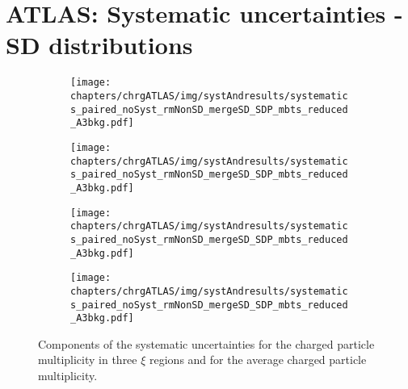 \chapter{{ATLAS: Systematic uncertainties - SD distributions}}\label{section:atlas_systematics_sd}

\begin{figure}[h!]
	\centering
	\begin{subfigure}{.49\textwidth}
		\texttt{[image: chapters/chrgATLAS/img/systAndresults/systematics\_paired\_noSyst\_rmNonSD\_mergeSD\_SDP\_mbts\_reduced\_A3bkg.pdf]}
	\end{subfigure}
	\begin{subfigure}{.49\textwidth}
		\texttt{[image: chapters/chrgATLAS/img/systAndresults/systematics\_paired\_noSyst\_rmNonSD\_mergeSD\_SDP\_mbts\_reduced\_A3bkg.pdf]}
	\end{subfigure}
	\begin{subfigure}{.49\textwidth}
		\texttt{[image: chapters/chrgATLAS/img/systAndresults/systematics\_paired\_noSyst\_rmNonSD\_mergeSD\_SDP\_mbts\_reduced\_A3bkg.pdf]}
	\end{subfigure}
	\begin{subfigure}{.49\textwidth}
		\texttt{[image: chapters/chrgATLAS/img/systAndresults/systematics\_paired\_noSyst\_rmNonSD\_mergeSD\_SDP\_mbts\_reduced\_A3bkg.pdf]}
	\end{subfigure}
	\caption{Components of the systematic uncertainties for the charged particle multiplicity in three $\xi$ regions and for the average charged particle multiplicity.}
	\label{fig:results_atlas_nch_syst_sd}
\end{figure}

